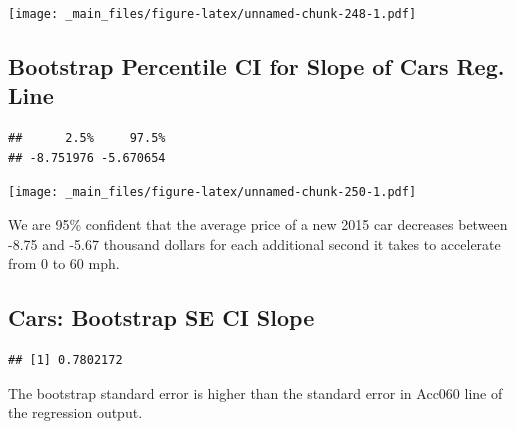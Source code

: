 \documentclass[]{book}
\newenvironment{Shaded}{\begin{snugshade}}{\end{snugshade}}
\newcommand{\KeywordTok}[1]{\textcolor[rgb]{0.13,0.29,0.53}{\textbf{#1}}}
\newcommand{\DecValTok}[1]{\textcolor[rgb]{0.00,0.00,0.81}{#1}}
\newcommand{\FloatTok}[1]{\textcolor[rgb]{0.00,0.00,0.81}{#1}}
\newcommand{\StringTok}[1]{\textcolor[rgb]{0.31,0.60,0.02}{#1}}
\newcommand{\OperatorTok}[1]{\textcolor[rgb]{0.81,0.36,0.00}{\textbf{#1}}}
\newcommand{\NormalTok}[1]{#1}
\begin{document}
\texttt{[image: \_main\_files/figure-latex/unnamed-chunk-248-1.pdf]}

\subsection{Bootstrap Percentile CI for Slope of Cars Reg.
Line}\label{bootstrap-percentile-ci-for-slope-of-cars-reg.-line}

\begin{Shaded}
\end{Shaded}

\begin{verbatim}
##      2.5%     97.5% 
## -8.751976 -5.670654
\end{verbatim}

\texttt{[image: \_main\_files/figure-latex/unnamed-chunk-250-1.pdf]}

We are 95\% confident that the average price of a new 2015 car decreases
between -8.75 and -5.67 thousand dollars for each additional second it
takes to accelerate from 0 to 60 mph.

\subsection{Cars: Bootstrap SE CI
Slope}\label{cars-bootstrap-se-ci-slope}

\begin{Shaded}
\end{Shaded}

\begin{verbatim}
## [1] 0.7802172
\end{verbatim}

The bootstrap standard error is higher than the standard error in Acc060
line of the regression output.
\end{document}
